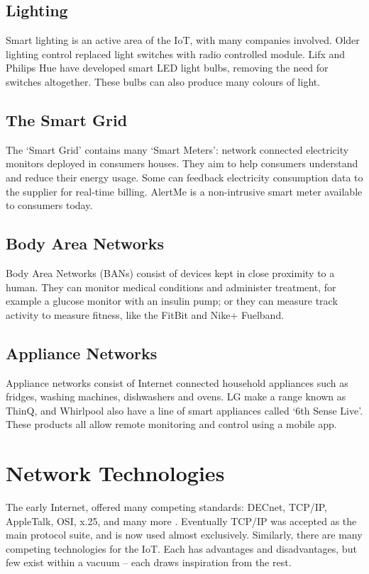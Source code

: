 \documentclass[10pt,journal,compsoc]{IEEEtran}
\begin{document}
\subsection{Lighting}
Smart lighting is an active area of the IoT, with many companies involved.
Older lighting control replaced light switches with radio controlled module.
Lifx and Philips Hue have developed smart LED light bulbs, removing the need
for switches altogether. These bulbs can also produce many colours of light. 

\subsection{The Smart Grid}
The `Smart Grid' contains many `Smart Meters': network connected electricity
monitors deployed in consumers houses. They aim to help consumers understand
and reduce their energy usage.  Some can feedback electricity consumption data
to the supplier for real-time billing.  AlertMe is a non-intrusive smart meter
available to consumers today. 

\subsection{Body Area Networks}
Body Area Networks (BANs) consist of devices kept in close proximity to a
human. They can monitor medical conditions and administer treatment, for
example a glucose monitor with an insulin pump; or they can measure track
activity to measure fitness, like the FitBit and Nike+ Fuelband. 

\subsection{Appliance Networks} 
Appliance networks consist of Internet connected household appliances such as
fridges, washing machines, dishwashers and ovens.  LG make a range known as
ThinQ, and Whirlpool also have a line of smart appliances called `6th Sense
Live'. These products all allow remote monitoring and control using a mobile
app.


\section{Network Technologies}
The early Internet, offered many competing standards: DECnet, TCP/IP,
AppleTalk, OSI, x.25, and many more \cite{Cerf1993}. Eventually TCP/IP was
accepted as the main protocol suite, and is now used almost exclusively.
Similarly, there are many competing technologies for the IoT. Each has
advantages and disadvantages, but few exist within a vacuum -- each draws
inspiration from the rest. 
\end{document}
